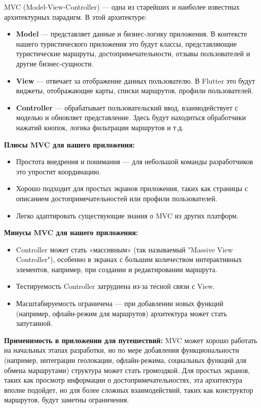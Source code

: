 MVC (Model-View-Controller) — одна из старейших и наиболее известных архитектурных парадигм. В этой архитектуре:

\begin{itemize}
    \item \textbf{Model} — представляет данные и бизнес-логику приложения. В контексте нашего туристического приложения это будут классы, представляющие туристические маршруты, достопримечательности, отзывы пользователей и другие бизнес-сущности.
    \item \textbf{View} — отвечает за отображение данных пользователю. В Flutter это будут виджеты, отображающие карты, списки маршрутов, профили пользователей.
    \item \textbf{Controller} — обрабатывает пользовательский ввод, взаимодействует с моделью и обновляет представление. Здесь будут находиться обработчики нажатий кнопок, логика фильтрации маршрутов и т.д.
\end{itemize}

\textbf{Плюсы MVC для нашего приложения:}
\begin{itemize}
    \item Простота внедрения и понимания — для небольшой команды разработчиков это упростит координацию.
    \item Хорошо подходит для простых экранов приложения, таких как страницы с описанием достопримечательностей или профили пользователей.
    \item Легко адаптировать существующие знания о MVC из других платформ.
\end{itemize}

\textbf{Минусы MVC для нашего приложения:}
\begin{itemize}
    \item Controller может стать «массивным» (так называемый "Massive View Controller"), особенно в экранах с большим количеством интерактивных элементов, например, при создании и редактировании маршрута.
    \item Тестируемость Controller затруднена из-за тесной связи с View.
    \item Масштабируемость ограничена — при добавлении новых функций (например, офлайн-режим для маршрутов) архитектура может стать запутанной.
\end{itemize}

\textbf{Применимость в приложении для путешествий:}
MVC может хорошо работать на начальных этапах разработки, но по мере добавления функциональности (например, интеграции геолокации, офлайн-режима, социальных функций для обмена маршрутами) структура может стать громоздкой. Для простых экранов, таких как просмотр информации о достопримечательностях, эта архитектура вполне подойдет, но для более сложных взаимодействий, таких как конструктор маршрутов, будут заметны ограничения.

